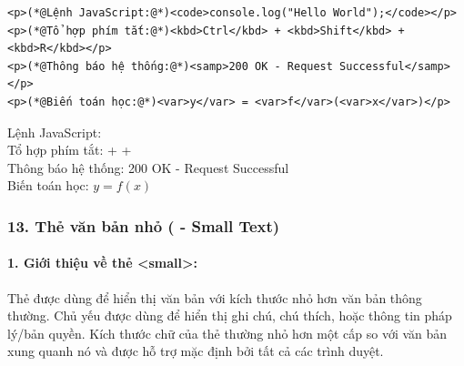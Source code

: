 \begin{codeWindow}
\begin{lstlisting}[language=HTML5]
<p>(*@Lệnh JavaScript:@*)<code>console.log("Hello World");</code></p>
<p>(*@Tổ hợp phím tắt:@*)<kbd>Ctrl</kbd> + <kbd>Shift</kbd> + <kbd>R</kbd></p>
<p>(*@Thông báo hệ thống:@*)<samp>200 OK - Request Successful</samp></p>
<p>(*@Biến toán học:@*)<var>y</var> = <var>f</var>(<var>x</var>)</p>
\end{lstlisting}
\end{codeWindow}
\begin{tcolorbox}[
    enhanced,
    colback=white,
    colframe=primaryBlue!20,
    arc=6pt,
    boxrule=0.8pt,
    drop shadow=black!3!white,
    top=8pt, bottom=8pt, left=12pt, right=12pt,
    title={\sffamily\bfseries\scriptsize\color{codeComment} KẾT QUẢ HIỂN THỊ TRÊN TRÌNH DUYỆT (PROGRAMMING ELEMENTS PREVIEW)},
    coltitle=codeComment,
    colbacktitle=codeBg!80!white
]
Lệnh JavaScript: \\[4pt]
Tổ hợp phím tắt:  +  + \\[4pt]
Thông báo hệ thống: {\ttfamily\color{codeString} 200 OK - Request Successful}\\[4pt]
Biến toán học: $\mathit{y} = \mathit{f}(\mathit{x})$
\end{tcolorbox}


\subsubsection{13. Thẻ văn bản nhỏ ( - Small Text)}

\paragraph{1. Giới thiệu về thẻ <small>:}
Thẻ  được dùng để hiển thị văn bản với kích thước nhỏ hơn văn bản thông thường. Chủ yếu được dùng để hiển thị ghi chú, chú thích, hoặc thông tin pháp lý/bản quyền. Kích thước chữ của thẻ  thường nhỏ hơn một cấp so với văn bản xung quanh nó và được hỗ trợ mặc định bởi tất cả các trình duyệt.

